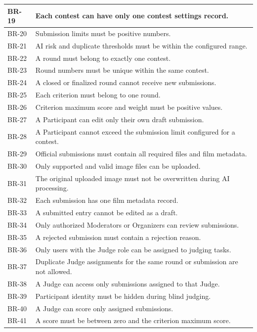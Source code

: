\begin{longtable}{|>{\centering\arraybackslash}p{}|>{\raggedright\arraybackslash}p{}|}
\hline
BR-19 & Each contest can have only one contest settings record. \\
\hline
BR-20 & Submission limits must be positive numbers. \\
\hline
BR-21 & AI risk and duplicate thresholds must be within the configured range. \\
\hline
BR-22 & A round must belong to exactly one contest. \\
\hline
BR-23 & Round numbers must be unique within the same contest. \\
\hline
BR-24 & A closed or finalized round cannot receive new submissions. \\
\hline
BR-25 & Each criterion must belong to one round. \\
\hline
BR-26 & Criterion maximum score and weight must be positive values. \\
\hline
BR-27 & A Participant can edit only their own draft submission. \\
\hline
BR-28 & A Participant cannot exceed the submission limit configured for a contest. \\
\hline
BR-29 & Official submissions must contain all required files and film metadata. \\
\hline
BR-30 & Only supported and valid image files can be uploaded. \\
\hline
BR-31 & The original uploaded image must not be overwritten during AI processing. \\
\hline
BR-32 & Each submission has one film metadata record. \\
\hline
BR-33 & A submitted entry cannot be edited as a draft. \\
\hline
BR-34 & Only authorized Moderators or Organizers can review submissions. \\
\hline
BR-35 & A rejected submission must contain a rejection reason. \\
\hline
BR-36 & Only users with the Judge role can be assigned to judging tasks. \\
\hline
BR-37 & Duplicate Judge assignments for the same round or submission are not allowed. \\
\hline
BR-38 & A Judge can access only submissions assigned to that Judge. \\
\hline
BR-39 & Participant identity must be hidden during blind judging. \\
\hline
BR-40 & A Judge can score only assigned submissions. \\
\hline
BR-41 & A score must be between zero and the criterion maximum score. \\

\end{longtable}
